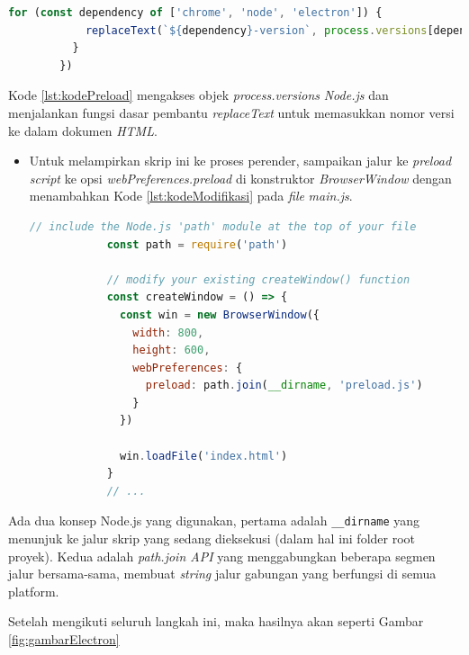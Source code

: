 \begin{enumerate}
\begin{itemize}
\begin{lstlisting}[language=JavaScript, caption=Kode \textit{preload.js}\label{lst:kodePreload}]
          for (const dependency of ['chrome', 'node', 'electron']) {
            replaceText(`${dependency}-version`, process.versions[dependency])
          }
        })
        \end{lstlisting}
    \end{itemize}
    Kode \ref{lst:kodePreload} mengakses objek \textit{process.versions} \textit{Node.js} dan menjalankan fungsi dasar pembantu \textit{replaceText} untuk memasukkan nomor versi ke dalam dokumen \textit{HTML}. 
    \begin{itemize}
        \item Untuk melampirkan skrip ini ke proses perender, sampaikan jalur ke \textit{preload script} ke opsi \textit{webPreferences.preload} di konstruktor \textit{BrowserWindow} dengan menambahkan  Kode \ref{lst:kodeModifikasi} pada \textit{file} \textit{main.js}.
        \begin{lstlisting}[language=JavaScript, caption=Penambahan kode pada \textit{file} \textit{main.js}\label{lst:kodeModifikasi}]
            // include the Node.js 'path' module at the top of your file
            const path = require('path')
            
            // modify your existing createWindow() function
            const createWindow = () => {
              const win = new BrowserWindow({
                width: 800,
                height: 600,
                webPreferences: {
                  preload: path.join(__dirname, 'preload.js')
                }
              })
            
              win.loadFile('index.html')
            }
            // ...
            \end{lstlisting}
    \end{itemize}
    Ada dua konsep Node.js yang digunakan, pertama adalah \texttt{\_\_dirname} yang menunjuk ke jalur skrip yang sedang dieksekusi (dalam hal ini folder root proyek). Kedua adalah 
    \textit{path.join API} yang menggabungkan beberapa segmen jalur bersama-sama, membuat \textit{string} jalur gabungan yang berfungsi di semua platform.
    
    Setelah mengikuti seluruh langkah ini, maka hasilnya akan seperti Gambar \ref{fig:gambarElectron}
    

\end{enumerate}
